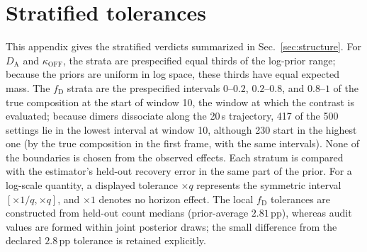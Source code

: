 \documentclass{article}
\newcommand{\fD}{f_{\mathrm{D}}}
\newcommand{\DA}{D_{\mathrm{A}}}
\newcommand{\koff}{\kappa_{\mathrm{OFF}}}
\newcommand{\pp}{\,\mathrm{pp}}
\begin{document}
\begingroup
\small


\endgroup

\newpage


\newpage
\appendix

\section{Stratified tolerances}
\label{app:strata}

This appendix gives the stratified verdicts summarized in
Sec.~\ref{sec:structure}. For $\DA$ and $\koff$, the strata are prespecified
equal thirds of the log-prior range; because the priors are uniform in log space, these thirds have
equal expected mass. The $\fD$ strata are the prespecified intervals $0$--$0.2$, $0.2$--$0.8$,
and $0.8$--$1$ of the true composition at the start of window 10, the window
at which the contrast is evaluated; because dimers dissociate along the 20\,s
trajectory, 417 of the 500 settings lie in the lowest interval at window 10,
although 230 start in the highest one (by the true composition in the first
frame, with the same intervals). None of the boundaries is chosen from the
observed effects. Each stratum is compared with the estimator's
held-out recovery error in the same part of the prior. For a log-scale
quantity, a displayed tolerance $\times q$ represents the symmetric interval
$[\times1/q,\times q]$, and $\times1$ denotes no horizon effect. The local
$\fD$ tolerances are constructed from held-out count medians (prior-average
$2.81\pp$), whereas audit values are formed within joint posterior draws; the
small difference from the declared $2.8\pp$ tolerance is retained explicitly.
\end{document}
